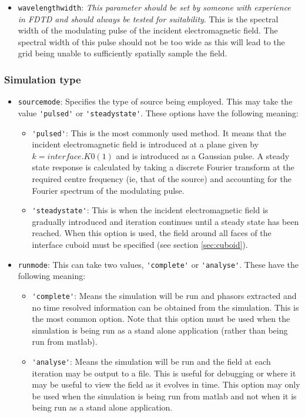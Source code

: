 \documentclass[a4paper, 12pt]{article}
\begin{document}
\begin{itemize}
		\item \verb+wavelengthwidth+: \emph{This parameter should be set by someone
			with experience in FDTD and should always be tested for
			suitability}. This is the spectral width of the modulating pulse of
		the incident electromagnetic field. The spectral width of this pulse
		should not be too wide as this will lead to the grid being unable to
		sufficiently spatially sample the field.
	\end{itemize}
	\subsubsection{Simulation type}
	\begin{itemize}
		\item \verb+sourcemode+: Specifies the type of source being
		employed. This may take the value \verb+'pulsed'+ or
		\verb+'steadystate'+. These options have the following meaning:
		\begin{itemize}
			\item \verb+'pulsed'+: This is the most commonly used method. It
			means that the incident electromagnetic field is introduced at a
			plane given by $k=interface.K0(1)$ and is introduced as a Gaussian
			pulse. A steady state response is calculated by taking a discrete
			Fourier transform at the required centre frequency (ie, that of
			the source) and accounting for the Fourier spectrum of the
			modulating pulse.
			\item
			\verb+'steadystate'+:
			This is when the incident electromagnetic field is gradually
			introduced and iteration continues until a steady state has been
			reached. When this option is used, the field around all faces of
			the interface cuboid must be specified (see section
			\ref{sec:cuboid}).
		\end{itemize}
		\item \verb+runmode+: This can take two values, \verb+'complete'+ or
		\verb+'analyse'+. These have the following meaning:
		\begin{itemize}
			\item \verb+'complete'+: Means the simulation will be run and phasors
			extracted and no time resolved information can be obtained from the
			simulation. This is the most common option. Note that this option
			must be used when the simulation is being run as a stand alone
			application (rather than being run from matlab).
			\item \verb+'analyse'+: Means the simulation will be run and the field
			at each iteration may be output to a file. This is useful for
			debugging or where it may be useful to view the field as it evolves
			in time. This option may only be used when the simulation is being
			run from matlab and not when it is being run as a stand alone application.
		\end{itemize}
	\end{itemize}
\end{document}
